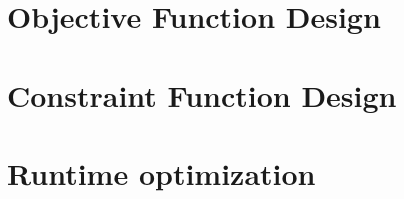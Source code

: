 \section{Objective Function Design}
\label{text:approach/objective}




\section{Constraint Function Design}
\label{text:approach/constraint}




\section{Runtime optimization}
\label{text:approach/runtime}



